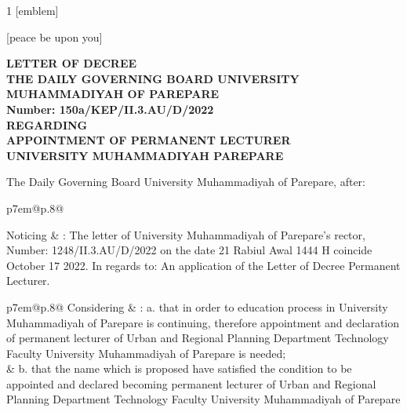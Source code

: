 \documentclass[12pt,a4paper]{lortwo}
\begin{document}



\vspace{10pt}

\begin{center}
\begin{spacing}{1}
[emblem]

[peace be upon you]
\end{spacing}
\bfseries
LETTER OF DECREE\\
THE DAILY GOVERNING BOARD UNIVERSITY MUHAMMADIYAH OF PAREPARE\\
{\normalfont Number: 150a/KEP/II.3.AU/D/2022}\\
REGARDING\\
APPOINTMENT OF PERMANENT LECTURER\\
UNIVERSITY MUHAMMADIYAH PAREPARE\\
\end{center}

The Daily Governing Board University Muhammadiyah of Parepare, after:

    \begin{tabular}{p{7em}@{}p{.8\linewidth}@{}}

Noticing & : The letter of University Muhammadiyah of Parepare's rector, Number: 1248/II.3.AU/D/2022 on the date 21 Rabiul Awal 1444 H coincide October 17 2022. In regards to: An application of the Letter of Decree Permanent Lecturer.\\

    \end{tabular}

    \begin{tabular}{p{7em}@{}p{.8\linewidth}@{}}
Considering & :
a. that in order to education process in University Muhammadiyah of Parepare is continuing, therefore appointment and declaration of permanent lecturer of Urban and Regional Planning Department Technology Faculty University Muhammadiyah of Parepare is needed;\\

& \hspace{5pt} b. that the name which is proposed have satisfied the condition to be appointed and declared becoming permanent lecturer of Urban and Regional Planning Department Technology Faculty University Muhammadiyah of Parepare
\\
    \end{tabular}
\end{document}
